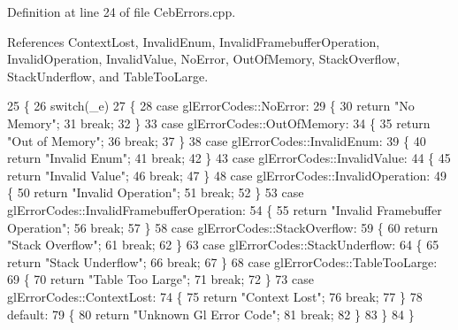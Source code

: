 Definition at line 24 of file Ceb\-Errors.\-cpp.



References Context\-Lost, Invalid\-Enum, Invalid\-Framebuffer\-Operation, Invalid\-Operation, Invalid\-Value, No\-Error, Out\-Of\-Memory, Stack\-Overflow, Stack\-Underflow, and Table\-Too\-Large.


\begin{DoxyCode}
25 \{
26   \textcolor{keywordflow}{switch}(\_e)
27   \{
28     \textcolor{keywordflow}{case} glErrorCodes::NoError:
29     \{
30       \textcolor{keywordflow}{return} \textcolor{stringliteral}{"No Memory"};
31       \textcolor{keywordflow}{break};
32     \}
33     \textcolor{keywordflow}{case} glErrorCodes::OutOfMemory:
34     \{
35       \textcolor{keywordflow}{return} \textcolor{stringliteral}{"Out of Memory"};
36       \textcolor{keywordflow}{break};
37     \}
38     \textcolor{keywordflow}{case} glErrorCodes::InvalidEnum:
39     \{
40       \textcolor{keywordflow}{return} \textcolor{stringliteral}{"Invalid Enum"};
41       \textcolor{keywordflow}{break};
42     \}
43     \textcolor{keywordflow}{case} glErrorCodes::InvalidValue:
44     \{
45       \textcolor{keywordflow}{return} \textcolor{stringliteral}{"Invalid Value"};
46       \textcolor{keywordflow}{break};
47     \}
48     \textcolor{keywordflow}{case} glErrorCodes::InvalidOperation:
49     \{
50       \textcolor{keywordflow}{return} \textcolor{stringliteral}{"Invalid Operation"};
51       \textcolor{keywordflow}{break};
52     \}
53     \textcolor{keywordflow}{case} glErrorCodes::InvalidFramebufferOperation:
54     \{
55       \textcolor{keywordflow}{return} \textcolor{stringliteral}{"Invalid Framebuffer Operation"};
56       \textcolor{keywordflow}{break};
57     \}
58     \textcolor{keywordflow}{case} glErrorCodes::StackOverflow:
59     \{
60       \textcolor{keywordflow}{return} \textcolor{stringliteral}{"Stack Overflow"};
61       \textcolor{keywordflow}{break};
62     \}
63     \textcolor{keywordflow}{case} glErrorCodes::StackUnderflow:
64     \{
65       \textcolor{keywordflow}{return} \textcolor{stringliteral}{"Stack Underflow"};
66       \textcolor{keywordflow}{break};
67     \}
68     \textcolor{keywordflow}{case} glErrorCodes::TableTooLarge:
69     \{
70       \textcolor{keywordflow}{return} \textcolor{stringliteral}{"Table Too Large"};
71       \textcolor{keywordflow}{break};
72     \}
73     \textcolor{keywordflow}{case} glErrorCodes::ContextLost:
74     \{
75       \textcolor{keywordflow}{return} \textcolor{stringliteral}{"Context Lost"};
76       \textcolor{keywordflow}{break};
77     \}
78     \textcolor{keywordflow}{default}:
79     \{
80       \textcolor{keywordflow}{return} \textcolor{stringliteral}{"Unknown Gl Error Code"};
81       \textcolor{keywordflow}{break};
82     \}
83   \}
84 \}
\end{DoxyCode}
